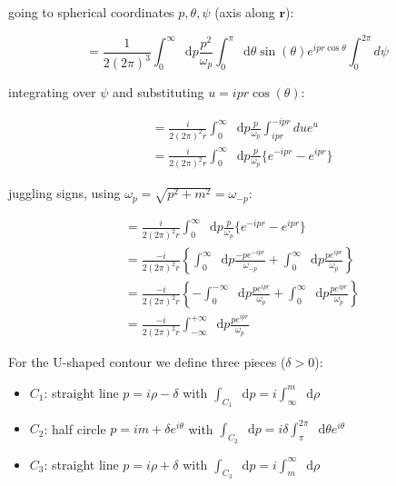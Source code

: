 \documentclass{beamer}
\newcommand{\sqrtpm}{\sqrt{p^2 + m^2}}
\newcommand{\vr}{\mathbf{r}}
\newcommand{\omp}{\omega_{p}}
\newcommand{\ommp}{\omega_{-p}}
\newcommand{\diffop}{\mathop{}\!\mathrm{d}}
\newcommand{\dip}{\diffop p}
\newcommand{\drho}{\diffop \rho}
\newcommand{\dtheta}{\diffop \theta}
\newcommand{\intii}{\int_{-\infty}^{+\infty}}
\begin{document}
\begin{frame}
going to spherical coordinates $p, \theta, \psi$ (axis along $\vr$):

\begin{equation*}
= \frac{1}{2(2\pi)^3} \int_0^\infty \dip \frac{p^2}{\omp} \int_0^\pi \dtheta \sin(\theta) e^{ipr\cos{\theta}}
\int_0^{2\pi} d\psi
\end{equation*}

integrating over $\psi$ and substituting $u = ipr\cos(\theta)$:

\begin{equation*}
\begin{split}
& = \frac{i}{2(2\pi)^2 r} \int_0^\infty \dip \frac{p}{\omp} \int_{ipr}^{-ipr} du e^{u} \\
& = \frac{i}{2(2\pi)^2 r} \int_0^\infty \dip \frac{p}{\omp} \big\{ e^{-ipr} - e^{ipr} \big\}
\end{split}
\end{equation*}

\end{frame}


\begin{frame}

juggling signs, using $\omp = \sqrtpm = \ommp$:

\begin{equation*}
\begin{split}
& = \frac{i}{2(2\pi)^2 r} \int_0^\infty \dip \frac{p}{\omp} \big\{ e^{-ipr} - e^{ipr} \big\} \\
& = \frac{-i}{2(2\pi)^2 r} \left\{ \int_0^\infty \dip \frac{-p e^{-ipr}}{\ommp} + \int_0^\infty \dip \frac{p e^{ipr}}{\omp} \right\} \\
& = \frac{-i}{2(2\pi)^2 r} \left\{ -\int_0^{-\infty} \dip \frac{p e^{ipr}}{\omp} + \int_0^\infty \dip \frac{p e^{ipr}}{\omp} \right\} \\
& = \frac{-i}{2(2\pi)^2 r} \intii \dip \frac{p e^{ipr}}{\omp}
\end{split}
\end{equation*}
\end{frame}


\begin{frame}
For the U-shaped contour we define three pieces ($\delta > 0$):
\begin{itemize}
\item $C_1$: straight line $p = i\rho - \delta$ with $\int_{C_1} \dip = i \int_\infty^m \drho$
\item $C_2$: half circle $p = im + \delta e^{i\theta}$ with $\int_{C_2} \dip = i\delta \int_\pi^{2\pi} \dtheta e^{i\theta}$
\item $C_3$: straight line $p = i\rho + \delta$ with $\int_{C_3} \dip = i \int_m^\infty \drho$
\end{itemize}
\end{frame}
\end{document}
